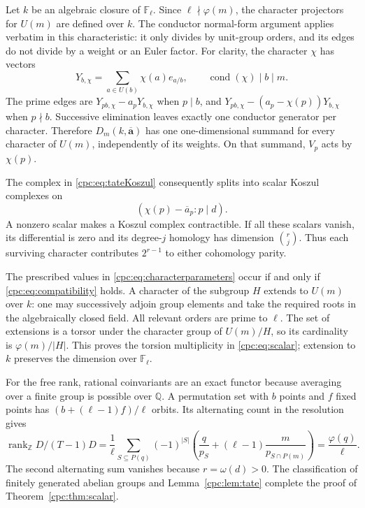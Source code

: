 \documentclass[11pt,a4paper]{article}
\numberwithin{equation}{section}
\theoremstyle{definition}
\theoremstyle{remark}
\begin{document}
Let $k$ be an algebraic closure of $\mathbb F_\ell$. Since
$\ell\nmid\varphi(m)$, the character projectors for $U(m)$ are
defined over $k$. The conductor normal-form argument applies
verbatim in this characteristic: it only divides by unit-group
orders, and its edges do not divide by a weight or an Euler factor.
For clarity, the character $\chi$ has vectors
\[
 Y_{b,\chi}=\sum_{a\in U(b)}\chi(a)e_{a/b},
 \qquad \operatorname{cond}(\chi)\mid b\mid m.
\]
The prime edges are
$Y_{pb,\chi}-a_pY_{b,\chi}$ when $p\mid b$, and
$Y_{pb,\chi}-(a_p-\chi(p))Y_{b,\chi}$ when $p\nmid b$.
Successive elimination leaves exactly one conductor generator per
character. Therefore $D_m(k,\overline{\mathbf a})$ has one
one-dimensional summand for every character of $U(m)$, independently
of its weights. On that summand, $V_p$ acts by $\chi(p)$.

The complex in \eqref{cpc:eq:tateKoszul} consequently splits into
scalar Koszul complexes on
\begin{equation}\label{cpc:eq:characterparameters}
 (\chi(p)-\overline a_p:p\mid d).
\end{equation}
A nonzero scalar makes a Koszul complex contractible. If all these
scalars vanish, its differential is zero and its degree-$j$
homology has dimension $\binom rj$. Thus each surviving character
contributes $2^{r-1}$ to either cohomology parity.

The prescribed values in \eqref{cpc:eq:characterparameters} occur
if and only if \eqref{cpc:eq:compatibility} holds. A character of
the subgroup $H$ extends to $U(m)$ over $k$: one may successively
adjoin group elements and take the required roots in the algebraically
closed field. All relevant orders are prime to $\ell$. The set of
extensions is a torsor under the character group of $U(m)/H$, so
its cardinality is $\varphi(m)/|H|$. This proves the torsion
multiplicity in \eqref{cpc:eq:scalar}; extension to $k$ preserves
the dimension over $\mathbb F_\ell$.

For the free rank, rational coinvariants are an exact functor because
averaging over a finite group is possible over $\mathbb Q$. A
permutation set with $b$ points and $f$ fixed points has
$(b+(\ell-1)f)/\ell$ orbits. Its alternating count in the resolution
gives
\[
 \operatorname{rank}_{\mathbb Z}D/(T-1)D
 =\frac1\ell\sum_{S\subseteq P(q)}(-1)^{|S|}
 \left(\frac q{p_S}+(\ell-1)
           \frac m{p_{S\cap P(m)}}\right)
 =\frac{\varphi(q)}\ell.
\]
The second alternating sum vanishes because $r=\omega(d)>0$.
The classification of finitely generated abelian groups and
Lemma~\ref{cpc:lem:tate} complete the proof of
Theorem~\ref{cpc:thm:scalar}.
\end{document}
